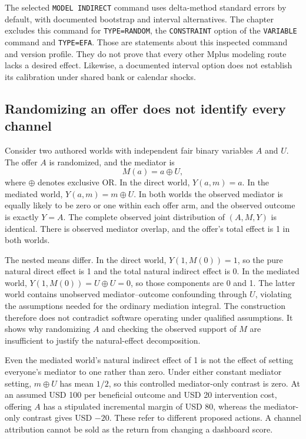 The selected \texttt{MODEL INDIRECT} command uses delta-method standard errors by default, with documented bootstrap and interval alternatives. The chapter excludes this command for \texttt{TYPE=RANDOM}, the \texttt{CONSTRAINT} option of the \texttt{VARIABLE} command and \texttt{TYPE=EFA}. Those are statements about this inspected command and version profile. They do not prove that every other Mplus modeling route lacks a desired effect. Likewise, a documented interval option does not establish its calibration under shared bank or calendar shocks.

\subsection{Randomizing an offer does not identify every channel}
\label{exec20:med-nonidentification}
Consider two authored worlds with independent fair binary variables $A$ and $U$. The offer $A$ is randomized, and the mediator is
\begin{equation}
 M(a)=a\mathbin{\oplus}U,
 \label{exec20:med-xor}
\end{equation}
where $\oplus$ denotes exclusive OR. In the direct world, $Y(a,m)=a$. In the mediated world, $Y(a,m)=m\mathbin{\oplus}U$. In both worlds the observed mediator is equally likely to be zero or one within each offer arm, and the observed outcome is exactly $Y=A$. The complete observed joint distribution of $(A,M,Y)$ is identical. There is observed mediator overlap, and the offer's total effect is 1 in both worlds.~\citep{exec20_med_reference}

The nested means differ. In the direct world, $Y(1,M(0))=1$, so the pure natural direct effect is 1 and the total natural indirect effect is 0. In the mediated world,
$Y(1,M(0))=U\oplus U=0$, so those components are 0 and 1. The latter world contains unobserved mediator--outcome confounding through $U$, violating the assumptions needed for the ordinary mediation integral. The construction therefore does not contradict software operating under qualified assumptions. It shows why randomizing $A$ and checking the observed support of $M$ are insufficient to justify the natural-effect decomposition.

Even the mediated world's natural indirect effect of 1 is not the effect of setting everyone's mediator to one rather than zero. Under either constant mediator setting, $m\oplus U$ has mean $1/2$, so this controlled mediator-only contrast is zero. At an assumed USD 100 per beneficial outcome and USD 20 intervention cost, offering $A$ has a stipulated incremental margin of USD 80, whereas the mediator-only contrast gives USD $-20$. These refer to different proposed actions. A channel attribution cannot be sold as the return from changing a dashboard score.


